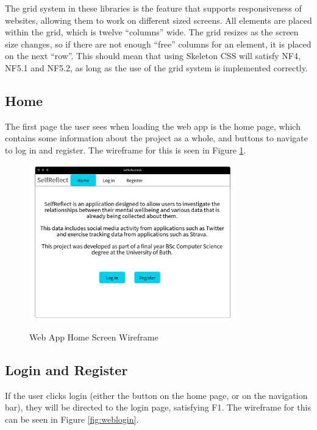 \documentclass[11pt,openright,a4paper]{report}
\begin{document}
The grid system in these libraries is the feature that supports responsiveness of websites, allowing them to work on different sized screens. All elements are placed within the grid, which is twelve \enquote{columns} wide. The grid resizes as the screen size changes, so if there are not enough \enquote{free} columns for an element, it is placed on the next \enquote{row}. This should mean that using Skeleton CSS will satisfy NF4, NF5.1 and NF5.2, as long as the use of the grid system is implemented correctly.

\subsection{Home}
The first page the user sees when loading the web app is the home page, which contains some information about the project as a whole, and buttons to navigate to log in and register. The wireframe for this is seen in Figure \ref{fig:webhome}.

\begin{figure}[ht]
\centering
\caption{Web App Home Screen Wireframe}
\includegraphics[width=0.8\textwidth]{i/webhome.png}
\label{fig:webhome}
\end{figure}

\newpage
\subsection{Login and Register}
If the user clicks login (either the button on the home page, or on the navigation bar), they will be directed to the login page, satisfying F1. The wireframe for this can be seen in Figure \ref{fig:weblogin}.
\end{document}
